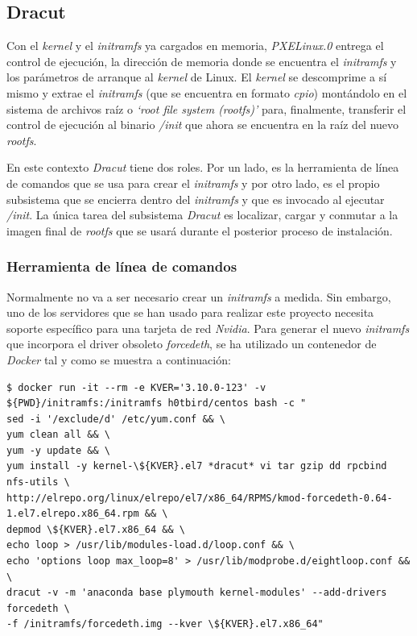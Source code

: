 \documentclass[a4paper,12pt,spanish,final]{epsc_tfc_pfc}
\begin{document}
\subsection{Dracut}
Con el \emph{kernel} y el \emph{initramfs} ya cargados en memoria, \emph{PXELinux.0} entrega el control de ejecución, la dirección de memoria donde se encuentra el \emph{initramfs} y los parámetros de arranque al \emph{kernel} de Linux. El \emph{kernel} se descomprime a sí mismo y extrae el \emph{initramfs} (que se encuentra en formato \emph{cpio}) montándolo en el sistema de archivos raíz o \emph{`root file system (rootfs)'} para, finalmente, transferir el control de ejecución al binario \emph{/init} que ahora se encuentra en la raíz del nuevo \emph{rootfs}.

En este contexto \emph{Dracut} tiene dos roles. Por un lado, es la herramienta de línea de comandos que se usa para crear el \emph{initramfs} y por otro lado, es el propio subsistema que se encierra dentro del \emph{initramfs} y que es invocado al ejecutar \emph{/init}. La única tarea del subsistema \emph{Dracut} es localizar, cargar y conmutar a la imagen final de \emph{rootfs} que se usará durante el posterior proceso de instalación.

\subsubsection{Herramienta de línea de comandos}
Normalmente no va a ser necesario crear un \emph{initramfs} a medida. Sin embargo, uno de los servidores que se han usado para realizar este proyecto necesita soporte específico para una tarjeta de red \emph{Nvidia}.
Para generar el nuevo \emph{initramfs} que incorpora el driver obsoleto \emph{forcedeth}, se ha utilizado un contenedor de \emph{Docker} tal y como se muestra a continuación:\\

\begin{lstlisting}[style=dnsmasq]
$ docker run -it --rm -e KVER='3.10.0-123' -v ${PWD}/initramfs:/initramfs h0tbird/centos bash -c "
sed -i '/exclude/d' /etc/yum.conf && \
yum clean all && \
yum -y update && \
yum install -y kernel-\${KVER}.el7 *dracut* vi tar gzip dd rpcbind nfs-utils \
http://elrepo.org/linux/elrepo/el7/x86_64/RPMS/kmod-forcedeth-0.64-1.el7.elrepo.x86_64.rpm && \
depmod \${KVER}.el7.x86_64 && \
echo loop > /usr/lib/modules-load.d/loop.conf && \
echo 'options loop max_loop=8' > /usr/lib/modprobe.d/eightloop.conf && \
dracut -v -m 'anaconda base plymouth kernel-modules' --add-drivers forcedeth \
-f /initramfs/forcedeth.img --kver \${KVER}.el7.x86_64"
\end{lstlisting}
\end{document}
